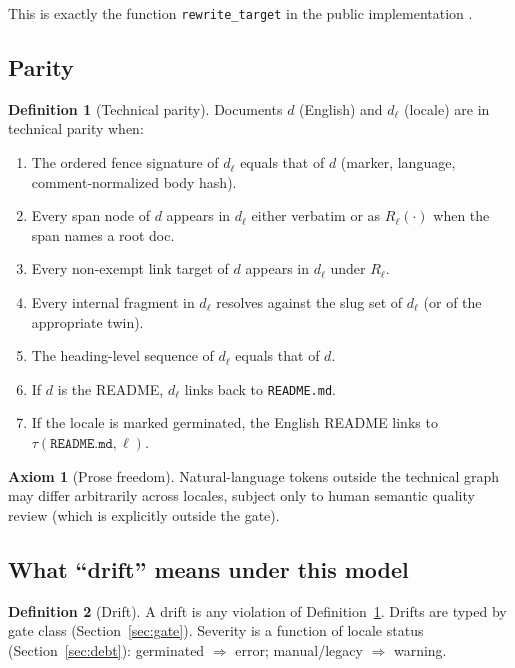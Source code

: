 \documentclass[11pt]{article}
\theoremstyle{definition}
\newtheorem{axiom}{Axiom}
\newtheorem{definition}{Definition}
\theoremstyle{plain}
\theoremstyle{remark}
\begin{document}
This is exactly the function \texttt{rewrite\_target} in the public
implementation \citep{hermespr80391}.

\subsection{Parity}

\begin{definition}[Technical parity]
\label{def:parity}
Documents $d$ (English) and $d_\ell$ (locale) are in technical parity when:
\begin{enumerate}[leftmargin=*]
\item The ordered fence signature of $d_\ell$ equals that of $d$
  (marker, language, comment-normalized body hash).
\item Every span node of $d$ appears in $d_\ell$ either verbatim or as
  $R_\ell(\cdot)$ when the span names a root doc.
\item Every non-exempt link target of $d$ appears in $d_\ell$ under
  $R_\ell$.
\item Every internal fragment in $d_\ell$ resolves against the slug set of
  $d_\ell$ (or of the appropriate twin).
\item The heading-level sequence of $d_\ell$ equals that of $d$.
\item If $d$ is the README, $d_\ell$ links back to \texttt{README.md}.
\item If the locale is marked germinated, the English README links to
  $\tau(\texttt{README.md}, \ell)$.
\end{enumerate}
\end{definition}

\begin{axiom}[Prose freedom]
\label{ax:prose}
Natural-language tokens outside the technical graph may differ arbitrarily
across locales, subject only to human semantic quality review (which is
explicitly outside the gate).
\end{axiom}

\subsection{What ``drift'' means under this model}

\begin{definition}[Drift]
\label{def:drift}
A drift is any violation of Definition~\ref{def:parity}. Drifts are typed by
gate class (Section~\ref{sec:gate}). Severity is a function of locale status
(Section~\ref{sec:debt}): germinated $\Rightarrow$ error; manual/legacy
$\Rightarrow$ warning.
\end{definition}
\end{document}
